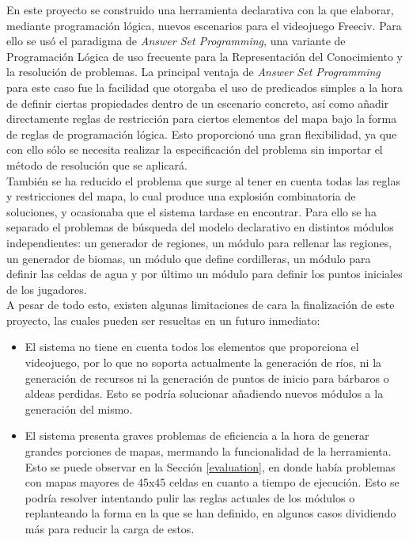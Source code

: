 En este proyecto se construido una herramienta declarativa con la que elaborar, mediante programación lógica, nuevos escenarios para el videojuego Freeciv. Para ello se usó el paradigma de \textit{Answer Set Programming}, una variante de Programación Lógica de uso frecuente para la Representación del Conocimiento y la resolución de problemas. La principal ventaja de \textit{Answer Set Programming} para este caso fue la facilidad que otorgaba el uso de predicados simples a la hora de definir ciertas propiedades dentro de un escenario concreto, así como añadir directamente reglas de restricción para ciertos elementos del mapa bajo la forma de reglas de programación lógica. Esto proporcionó una gran flexibilidad, ya que con ello sólo se necesita realizar la especificación del problema sin importar el método de resolución que se aplicará. \\

También se ha reducido el problema que surge al tener en cuenta todas las reglas y restricciones del mapa, lo cual produce una explosión combinatoria de soluciones, y ocasionaba que el sistema tardase en encontrar. Para ello se ha separado el problemas de búsqueda del modelo declarativo en distintos módulos independientes: un generador de regiones, un módulo para rellenar las regiones, un generador de biomas, un módulo que define cordilleras, un módulo para definir las celdas de agua y por último un módulo para definir los puntos iniciales de los jugadores. \\

A pesar de todo esto, existen algunas limitaciones de cara la finalización de este proyecto, las cuales pueden ser resueltas en un futuro inmediato:

\begin{itemize}
	\item El sistema no tiene en cuenta todos los elementos que proporciona el videojuego, por lo que no soporta actualmente la generación de ríos, ni la generación de recursos ni la generación de puntos de inicio para bárbaros o aldeas perdidas. Esto se podría solucionar añadiendo nuevos módulos a la generación del mismo.
	\item El sistema presenta graves problemas de eficiencia a la hora de generar grandes porciones de mapas, mermando la funcionalidad de la herramienta. Esto se puede observar en la Sección \ref{evaluation}, en donde había problemas con mapas mayores de 45x45 celdas en cuanto a tiempo de ejecución. Esto se podría resolver intentando pulir las reglas actuales de los módulos o replanteando la forma en la que se han definido, en algunos casos dividiendo más para reducir la carga de estos.
\end{itemize}

